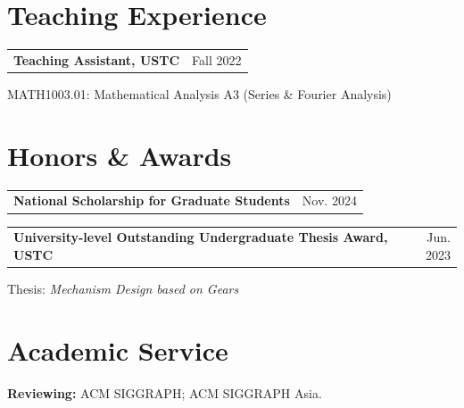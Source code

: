\documentclass[a4paper,11pt]{article}
\makeatletter
\newcommand{\cvheading}[2]{%
  \begin{tabularx}{\linewidth}{@{}X@{\hspace{1em}}r@{}}
    \textbf{#1} & #2
  \end{tabularx}\par
}
\newcommand{\entrygap}{\vspace{4pt}}
\makeatother
\begin{document}
\section{Teaching Experience}
\cvheading{Teaching Assistant, USTC}{Fall 2022}
MATH1003.01: Mathematical Analysis A3 (Series \& Fourier Analysis)

\section{Honors \& Awards}
\cvheading{National Scholarship for Graduate Students}{Nov. 2024}
\entrygap
\cvheading{University-level Outstanding Undergraduate Thesis Award, USTC}{Jun. 2023}
Thesis: \textit{Mechanism Design based on Gears}

\section{Academic Service}
\textbf{Reviewing:} ACM SIGGRAPH; ACM SIGGRAPH Asia.
\end{document}
